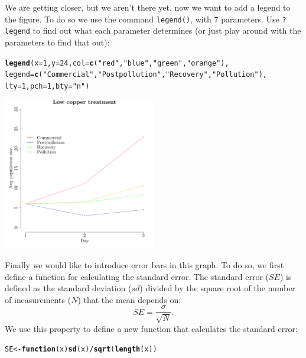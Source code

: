 \documentclass{article}\usepackage[]{graphicx}\usepackage[]{color}
\makeatletter
\newcommand{\hlnum}[1]{\textcolor[rgb]{0.686,0.059,0.569}{#1}}%
\newcommand{\hlstr}[1]{\textcolor[rgb]{0.192,0.494,0.8}{#1}}%
\newcommand{\hlopt}[1]{\textcolor[rgb]{0,0,0}{#1}}%
\newcommand{\hlstd}[1]{\textcolor[rgb]{0.345,0.345,0.345}{#1}}%
\newcommand{\hlkwa}[1]{\textcolor[rgb]{0.161,0.373,0.58}{\textbf{#1}}}%
\newcommand{\hlkwb}[1]{\textcolor[rgb]{0.69,0.353,0.396}{#1}}%
\newcommand{\hlkwc}[1]{\textcolor[rgb]{0.333,0.667,0.333}{#1}}%
\newcommand{\hlkwd}[1]{\textcolor[rgb]{0.737,0.353,0.396}{\textbf{#1}}}%
\newenvironment{kframe}{%
 \def\at@end@of@kframe{}%
 \ifinner\ifhmode%
  \def\at@end@of@kframe{\end{minipage}}%
  \begin{minipage}{\columnwidth}%
 \fi\fi%
 \def\FrameCommand##1{\hskip\@totalleftmargin \hskip-\fboxsep
 \colorbox{shadecolor}{##1}\hskip-\fboxsep
     \hskip-\linewidth \hskip-\@totalleftmargin \hskip\columnwidth}%
 \MakeFramed {\advance\hsize-\width
   \@totalleftmargin\z@ \linewidth\hsize
   \@setminipage}}%
 {\par\unskip\endMakeFramed%
 \at@end@of@kframe}
\newenvironment{knitrout}{}{} %
\makeatother
\begin{document}
We are getting closer, but we aren't there yet, now we want to add a legend to the figure. To do so we use the command \texttt{legend()}, with $7$ parameters. Use \texttt{?legend} to find out what each parameter determines (or just play around with the parameters to find that out):
\begin{knitrout}
\color{fgcolor}\begin{kframe}
\begin{alltt}
\hlkwd{legend}\hlstd{(}\hlkwc{x}\hlstd{=}\hlnum{1}\hlstd{,} \hlkwc{y}\hlstd{=}\hlnum{24}\hlstd{,} \hlkwc{col}\hlstd{=}\hlkwd{c}\hlstd{(}\hlstr{"red"}\hlstd{,}\hlstr{"blue"}\hlstd{,}\hlstr{"green"}\hlstd{,}\hlstr{"orange"}\hlstd{),}
\hlkwc{legend}\hlstd{=}\hlkwd{c}\hlstd{(}\hlstr{"Commercial"}\hlstd{,}\hlstr{"Postpollution"}\hlstd{,}\hlstr{"Recovery"}\hlstd{,}\hlstr{"Pollution"}\hlstd{),}
\hlkwc{lty}\hlstd{=}\hlnum{1}\hlstd{,} \hlkwc{pch}\hlstd{=}\hlnum{1}\hlstd{,} \hlkwc{bty}\hlstd{=}\hlstr{"n"}\hlstd{)}
\end{alltt}
\end{kframe}

{\centering \includegraphics[width=0.5\textwidth]{figure/gp7} 

}



\end{knitrout}

Finally we would like to introduce error bars in this graph. To do so, we first define a function for calculating the standard error. The standard error ($SE$) is defined as the standard deviation ($sd$) divided by the square root of the number of measurements ($N$) that the mean depends on:
\begin{equation*}
SE = \frac{\sigma}{\sqrt{N}}.
\end{equation*}
We use this property to define a new function that calculates the standard error:
\begin{knitrout}
\color{fgcolor}\begin{kframe}
\begin{alltt}
\hlstd{SE}\hlkwb{<-}\hlkwa{function}\hlstd{(}\hlkwc{x}\hlstd{)} \hlkwd{sd}\hlstd{(x)}\hlopt{/}\hlkwd{sqrt}\hlstd{(}\hlkwd{length}\hlstd{(x))}
\end{alltt}
\end{kframe}
\end{knitrout}
\end{document}
